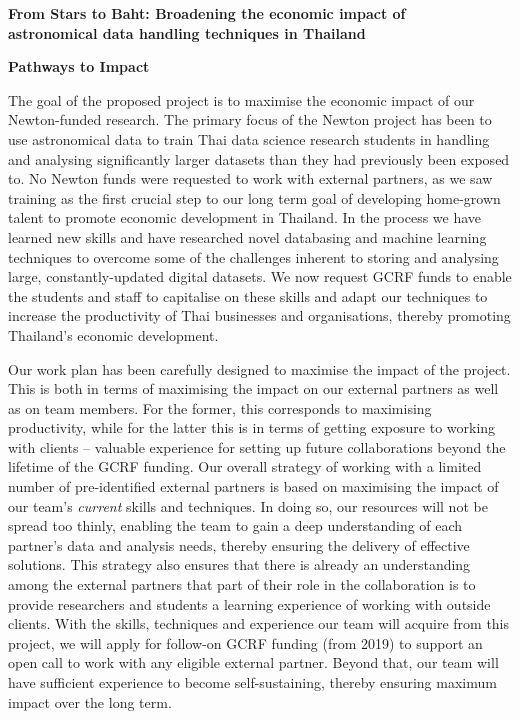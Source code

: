 \documentclass[11pt]{article}
\begin{document}
\setcounter{figure}{0}
\noindent
{\LARGE \bf From Stars to Baht: Broadening the economic impact of \\
astronomical data handling techniques in Thailand}

\vspace{3mm}

\noindent
{\LARGE \bf Pathways to Impact}

\vspace{3mm}
\noindent
The goal of the proposed project is to maximise the economic impact of our Newton-funded research. The primary focus of the Newton project has been to use astronomical data to train Thai data science research students in handling and analysing significantly larger datasets than they had previously been exposed to. No Newton funds were requested to work with external partners, as we saw training as the first crucial step to our long term goal of developing home-grown talent to promote economic development in Thailand. In the process we have learned new skills and have researched novel databasing and machine learning techniques to overcome some of the challenges inherent to storing and analysing large, constantly-updated digital datasets. We now request GCRF funds to enable the students and staff to capitalise on these skills and adapt our techniques to increase the productivity of Thai businesses and organisations, thereby promoting Thailand's economic development.  

\vspace{2mm}
\noindent
Our work plan has been carefully designed to maximise the impact of the project. This is both in terms of maximising the impact on our external partners as well as on team members. For the former, this corresponds to maximising productivity, while for the latter this is in terms of getting exposure to working with clients -- valuable experience for setting up future collaborations beyond the lifetime of the GCRF funding. Our overall strategy of working with a limited number of pre-identified external partners is based on maximising the impact of our team's {\it current} skills and techniques. In doing so, our resources will not be spread too thinly, enabling the team to gain a deep understanding of each partner's data and analysis needs, thereby ensuring the delivery of effective solutions. This strategy also ensures that there is already an understanding among the external partners that part of their role in the collaboration is to provide researchers and students a learning experience of working with outside clients. With the skills, techniques and experience our team will acquire from this project, we will apply for follow-on GCRF funding (from 2019) to support an open call to work with any eligible external partner. Beyond that, our team will have sufficient experience to become self-sustaining, thereby ensuring maximum impact over the long term.
\end{document}

